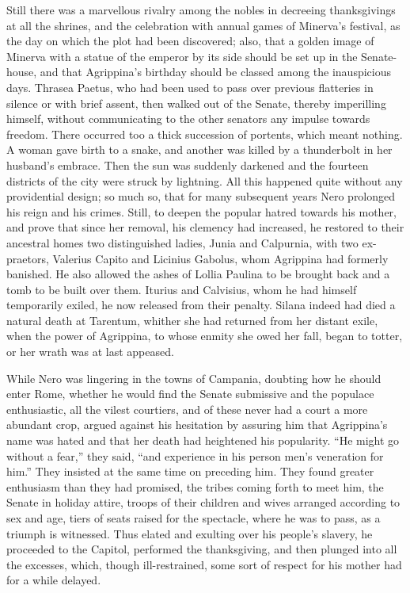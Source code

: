
Still there was a marvellous rivalry among the nobles in decreeing thanksgivings at all the shrines, and the celebration with annual games of Minerva's festival, as the day on which the plot had been discovered; also, that a golden image of Minerva with a statue of the emperor by its side should be set up in the Senate-house, and that Agrippina's birthday should be classed among the inauspicious days. Thrasea Paetus, who had been used to pass over previous flatteries in silence or with brief assent, then walked out of the Senate, thereby imperilling himself, without communicating to the other senators any impulse towards freedom. There occurred too a thick succession of portents, which meant nothing. A woman gave birth to a snake, and another was killed by a thunderbolt in her husband's embrace. Then the sun was suddenly darkened and the fourteen districts of the city were struck by lightning. All this happened quite without any providential design; so much so, that for many subsequent years Nero prolonged his reign and his crimes. Still, to deepen the popular hatred towards his mother, and prove that since her removal, his clemency had increased, he restored to their ancestral homes two distinguished ladies, Junia and Calpurnia, with two ex-praetors, Valerius Capito and Licinius Gabolus, whom Agrippina had formerly banished. He also allowed the ashes of Lollia Paulina to be brought back and a tomb to be built over them. Iturius and Calvisius, whom he had himself temporarily exiled, he now released from their penalty. Silana indeed had died a natural death at Tarentum, whither she had returned from her distant exile, when the power of Agrippina, to whose enmity she owed her fall, began to totter, or her wrath was at last appeased.


While Nero was lingering in the towns of Campania, doubting how he should enter Rome, whether he would find the Senate submissive and the populace enthusiastic, all the vilest courtiers, and of these never had a court a more abundant crop, argued against his hesitation by assuring him that Agrippina's name was hated and that her death had heightened his popularity. ``He might go without a fear,'' they said, ``and experience in his person men's veneration for him.'' They insisted at the same time on preceding him. They found greater enthusiasm than they had promised, the tribes coming forth to meet him, the Senate in holiday attire, troops of their children and wives arranged according to sex and age, tiers of seats raised for the spectacle, where he was to pass, as a triumph is witnessed. Thus elated and exulting over his people's slavery, he proceeded to the Capitol, performed the thanksgiving, and then plunged into all the excesses, which, though ill-restrained, some sort of respect for his mother had for a while delayed.

